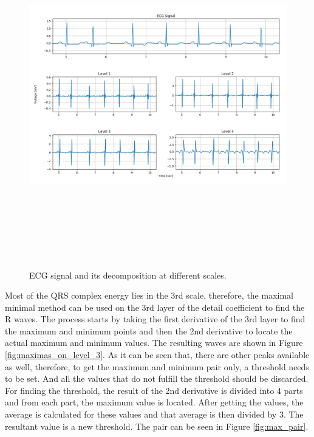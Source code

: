 \begin{figure}[htpb]
	\centering
	\includegraphics[width=15cm,height=15cm,keepaspectratio=true]{images/detail_coefficients}
	\caption{
		ECG signal and its decomposition at different scales.
	}
	\label{fig:detail_coefficients}
\end{figure}

Most of the QRS complex energy lies in the 3rd scale, therefore, the maximal minimal method can be used on the 3rd layer of the detail coefficient to find the R waves.  The process starts by taking the first derivative of the 3rd layer to find the maximum and minimum points and then the 2nd derivative to locate the actual maximum and minimum values. The resulting waves are shown in Figure \ref{fig:maximas_on_level_3}. As it can be seen that, there are other peaks available as well, therefore, to get the maximum and minimum pair only, a threshold needs to be set. And all the values that do not fulfill the threshold should be discarded. 
For finding the threshold, the result of the 2nd derivative is divided into 4 parts and from each part, the maximum value is located. After getting the values, the average is calculated for these values and that average is then divided by 3. The resultant value is a new threshold. The pair can be seen in Figure \ref{fig:max_pair}.

